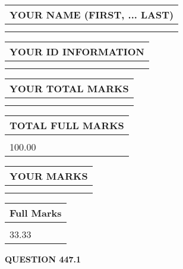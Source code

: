 \documentclass{ctexart}
\begin{document}
   
   
   
\newpage 
\setcounter{page}{ 
   447001 } 
   
   
   
   
\noindent\begin{tabular}{|l|}
\hline
YOUR NAME (FIRST, ... LAST)  \\
\hline
 \\ 
 \\ 
\hline
\end{tabular}
\hspace{0.05in} \begin{tabular}{|l|}
\hline
 YOUR   ID   INFORMATION  \\
\hline
 \\ 
 \\ 
\hline
\end{tabular}
   
   
\vspace{0.2in}\noindent\begin{tabular}{|l|}
\hline
YOUR TOTAL MARKS  \\
\hline
 \\ 
 \\ 
\hline
\end{tabular}
\hspace{0.05in} \begin{tabular}{|l|}
\hline
TOTAL FULL MARKS  \\
\hline
 \\ 
100.00 \\
\hline
\end{tabular}
   
   
 \vspace{0.2in}
 
 
 
 
   
   
  
\vspace{0.2in}
  
\noindent\begin{tabular}{|l|}
\hline
 YOUR MARKS  \\
\hline
 \\ 
 \\ 
\hline
\end{tabular}
\hspace{0.05in} \begin{tabular}{|l|}
\hline
 Full Marks  \\
\hline
 \\ 
33.33 \\
\hline
\end{tabular}
{\textbf{\Large{QUESTION
447.1 
}}}
  
\end{document}
